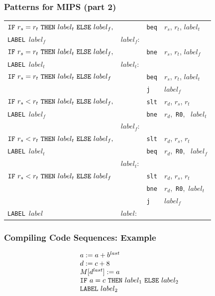 \documentclass{beamer}
\begin{document}
\begin{frame}
\frametitle{Patterns for MIPS (part 2)}

\renewcommand{\arraystretch}{0.9}
\begin{tabular}{|l|lll|}\hline


$  {\tt IF}~r_s = r_t~{\tt THEN}~label_t~ {\tt ELSE}~ label_f,$
&&  {\tt beq} & $r_s$, $r_t$, $label_t$ \\
{\tt LABEL}~$label_f  $
& $label_f$: & & \\\hline

$  {\tt IF}~r_s = r_t~{\tt THEN}~label_t~ {\tt ELSE}~ label_f,$
&&  {\tt bne} & $r_s$, $r_t$, $label_f$ \\
{\tt LABEL}~$label_t  $
& $label_t$: & & \\\hline

$  {\tt IF}~r_s = r_t~{\tt THEN}~label_t~ {\tt ELSE}~ label_f $
&& {\tt beq} & $r_s$, $r_t$, $label_t$ \\
&& {\tt j} & $label_f$ \\\hline

$  {\tt IF}~r_s < r_t~{\tt THEN}~label_t~ {\tt ELSE}~ label_f,$
&&  {\tt slt} & $r_d$, $r_s$, $r_t$ \\
{\tt LABEL}~$label_f  $
&&  {\tt bne} & $r_d$,~{\tt R0},~ $label_t$ \\
& $label_f$: & & \\\hline

$  {\tt IF}~r_s < r_t~{\tt THEN}~label_t~ {\tt ELSE}~ label_f,$
&& {\tt slt} & $r_d$, $r_s$, $r_t$ \\
{\tt LABEL}~$label_t  $
&&  {\tt beq} & $r_d$,~{\tt R0},~ $label_f$\\
& $label_t$: & & \\\hline

$  {\tt IF}~r_s < r_t~{\tt THEN}~label_t~ {\tt ELSE}~ label_f  $ 
&&  {\tt slt} & $r_d$, $r_s$, $r_t$ \\
&& {\tt bne} & $r_d$,~{\tt R0},~$label_t$ \\
&&  {\tt j} & $label_f$ \\\hline

{\tt LABEL}~$label$ & $label$: && \\\hline

\end{tabular}

\end{frame}




\begin{frame}
\frametitle{Compiling Code Sequences: Example}

\bigskip
\bigskip

\renewcommand{\arraystretch}{0.9}
\[\begin{array}{l}
a := a+b^{last} \\
d := c+8 \\
M[d^{last}] := a \\
{\tt IF}~a = c~{\tt THEN}~label_1~ {\tt ELSE}~ label_2 \\
{\tt LABEL}~label_2
\end{array}\]

\end{frame}
\end{document}
